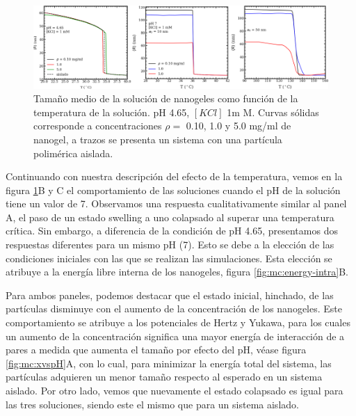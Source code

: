	\begin{figure}[!htb]
		\centering
		\includegraphics[width=0.99\linewidth]{Figures/graph-mc/rvsTs.pdf}
		\caption{Tama\~no medio de la soluci\'on de nanogeles como funci\'on de la temperatura de la soluci\'on. pH 4.65, $[KCl]$ 1m M. Curvas s\'olidas corresponde a concentraciones $\rho =$ 0.10, 1.0 y 5.0 mg/ml de nanogel, a trazos se presenta un sistema con una part\'icula polim\'erica aislada.}
		\label{fig:mc:temperatura-r}
	\end{figure}
	
Continuando con nuestra descripci\'on del efecto de la temperatura, vemos en la figura \ref{fig:mc:temperatura-r}B y C el comportamiento de las soluciones cuando el pH de la soluci\'on tiene un valor de 7. Observamos una respuesta cualitativamente similar al panel A, el paso de un estado swelling a uno colapsado al superar una temperatura cr\'itica. Sin embargo, a diferencia de la condici\'on de pH 4.65, presentamos dos respuestas diferentes para un mismo pH (7). Esto se debe a la elecci\'on de las condiciones iniciales con las que se realizan las simulaciones. Esta elecci\'on se atribuye a la energ\'ia libre interna de los nanogeles, figura \ref{fig:mc:energy-intra}B.

Para ambos paneles, podemos destacar que el estado inicial, hinchado, de las part\'iculas disminuye con el aumento de la concentraci\'on de los nanogeles. Este comportamiento se atribuye a los potenciales de Hertz y Yukawa, para los cuales un aumento de la concentraci\'on significa una mayor energ\'ia de interacci\'on de a pares a medida que aumenta el tama\~no por efecto del pH, v\'ease figura \ref{fig:mc:xvspH}A, con lo cual, para minimizar la energ\'ia total del sistema, las part\'iculas adquieren un menor tama\~no respecto al esperado en un sistema aislado. Por otro lado, vemos que nuevamente el estado colapsado es igual para las tres soluciones, siendo este el mismo que para un sistema aislado.

